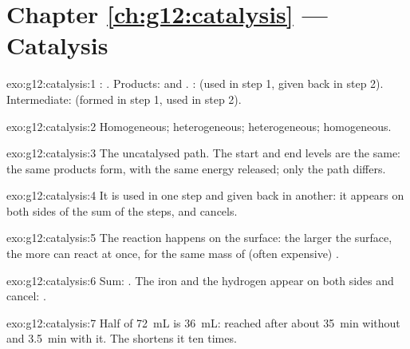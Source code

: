 \section*{Chapter \ref{ch:g12:catalysis} --- Catalysis}

\begin{solution}{exo:g12:catalysis:1}
: . Products:  and . : 
(used in step 1, given back in step 2). Intermediate:  (formed in
step 1, used in step 2).
\end{solution}

\begin{solution}{exo:g12:catalysis:2}
Homogeneous; heterogeneous; heterogeneous; homogeneous.
\end{solution}

\begin{solution}{exo:g12:catalysis:3}
The uncatalysed path. The start and end levels are the same: the same
products form, with the same energy released; only the path differs.
\end{solution}

\begin{solution}{exo:g12:catalysis:4}
It is used in one step and given back in another: it appears on both
sides of the sum of the steps, and cancels.
\end{solution}

\begin{solution}{exo:g12:catalysis:5}
The reaction happens on the surface: the larger the surface, the more
 can react at once, for the same mass of (often expensive)
.
\end{solution}

\begin{solution}{exo:g12:catalysis:6}
Sum: . The iron  and the hydrogen  appear on both
sides and cancel: .
\end{solution}

\begin{solution}{exo:g12:catalysis:7}
Half of \qty{72}{mL} is \qty{36}{mL}: reached after about \qty{35}{min}
without  and \qty{3.5}{min} with it. The  shortens it ten
times.
\end{solution}

